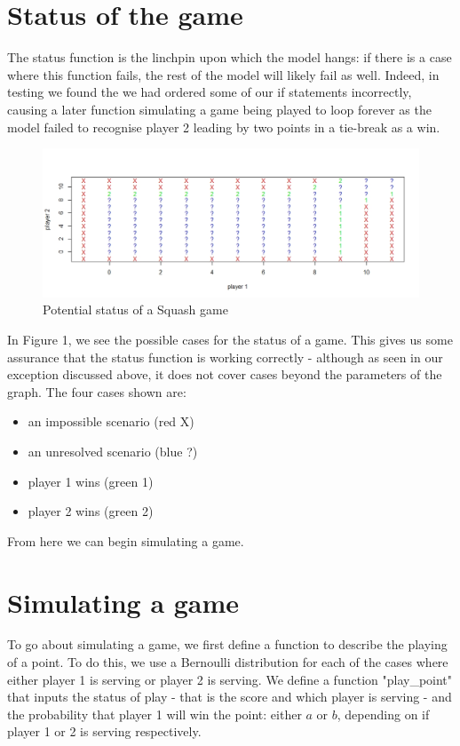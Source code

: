 \documentclass[a4paper, 11pt, oneside]{article}
\begin{document}
\section{Status of the game}

The status function is the linchpin upon which the model hangs: if there is a case where this function fails, the rest of the model will likely fail as well. Indeed, in testing we found the we had ordered some of our if statements incorrectly, causing a later function simulating a game being played to loop forever as the model failed to recognise player 2 leading by two points in a tie-break as a win.


\begin{figure}[h]
\centering
\includegraphics[width=\textwidth]{status}
\caption{Potential status of a Squash game}
\end{figure}

In Figure 1, we see the possible cases for the status of a game. This gives us some assurance that the status function is working correctly - although as seen in our exception discussed above, it does not cover cases beyond the parameters of the graph. The four cases shown are:
\begin{itemize}
\item an impossible scenario (red X)
\item an unresolved scenario (blue ?)
\item player 1 wins (green 1)
\item player 2 wins (green 2)
\end{itemize}

From here we can begin simulating a game.


\section{Simulating a game}

To go about simulating a game, we first define a function to describe the playing of a point.  To do this, we use a Bernoulli distribution for each of the cases where either player 1 is serving or player 2 is serving.  We define a function "play\_point" that inputs the status of play - that is the score and which player is serving - and the probability that player 1 will win the point: either $a$ or $b$, depending on if player 1 or 2 is serving respectively.\\
\end{document}
